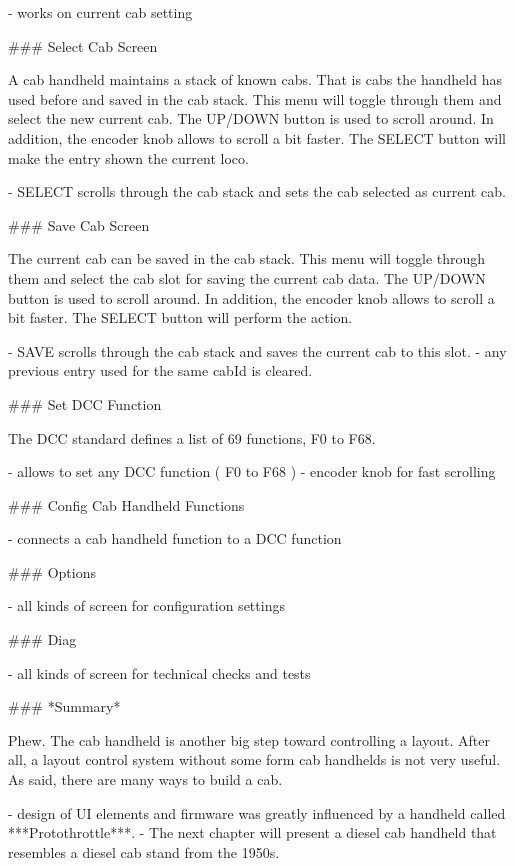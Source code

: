 - works on current cab setting

### Select Cab Screen

A cab handheld maintains a stack of known cabs. That is cabs the handheld has used before and saved in the cab stack. This menu will toggle through them and select the new current cab. The UP/DOWN button is used to scroll around. In addition, the encoder knob allows to scroll a bit faster. The SELECT button will make the entry shown the current loco.

- SELECT scrolls through the cab stack and sets the cab selected as current cab.

### Save Cab Screen

The current cab can be saved in the cab stack. This menu will toggle through them and select the cab slot for saving the current cab data. The UP/DOWN button is used to scroll around. In addition, the encoder knob allows to scroll a bit faster. The SELECT button will perform the action.

- SAVE scrolls through the cab stack and saves the current cab to this slot.
- any previous entry used for the same cabId is cleared.

### Set DCC Function

The DCC standard defines a list of 69 functions, F0 to F68.

- allows to set any DCC function ( F0 to F68 )
- encoder knob for fast scrolling

### Config Cab Handheld Functions

- connects a cab handheld function to a DCC function

### Options

- all kinds of screen for configuration settings

### Diag

- all kinds of screen for technical checks and tests

### *Summary*

Phew. The cab handheld is another big step toward controlling a layout. After all, a layout control system without some form cab handhelds is not very useful. As said, there are many ways to build a cab.

- design of UI elements and firmware was greatly influenced by a handheld called ***Protothrottle***.
- The next chapter will present a diesel cab handheld that resembles a diesel cab stand from the 1950s.
